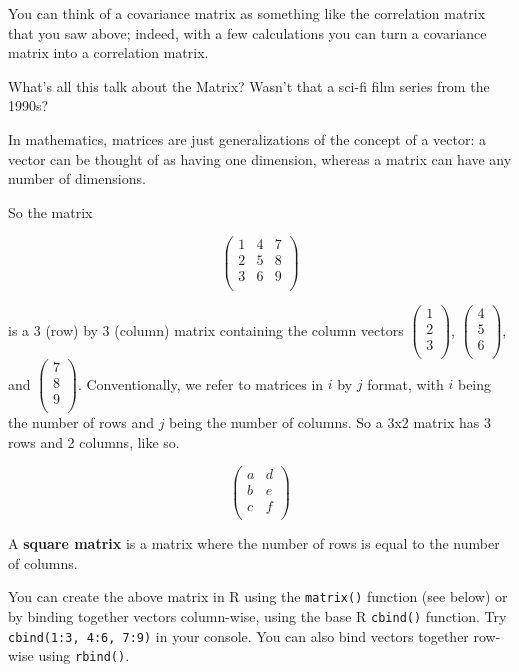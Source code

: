 \documentclass[]{book}
\begin{document}
You can think of a covariance matrix as something like the correlation matrix that you saw above; indeed, with a few calculations you can turn a covariance matrix into a correlation matrix.

\begin{info}
What's all this talk about the Matrix? Wasn't that a sci-fi film series
from the 1990s?

In mathematics, matrices are just generalizations of the concept of a
vector: a vector can be thought of as having one dimension, whereas a
matrix can have any number of dimensions.

So the matrix

\[
\begin{pmatrix}
1 & 4 & 7 \\
2 & 5 & 8 \\
3 & 6 & 9 \\
\end{pmatrix}
\]

is a 3 (row) by 3 (column) matrix containing the column vectors
\(\begin{pmatrix} 1 \\ 2 \\ 3 \\ \end{pmatrix}\),
\(\begin{pmatrix} 4 \\ 5 \\ 6 \\ \end{pmatrix}\), and
\(\begin{pmatrix} 7 \\ 8 \\ 9 \\ \end{pmatrix}\). Conventionally, we
refer to matrices in \(i\) by \(j\) format, with \(i\) being the number
of rows and \(j\) being the number of columns. So a 3x2 matrix has 3
rows and 2 columns, like so.

\[
\begin{pmatrix}
a & d \\
b & e \\
c & f \\
\end{pmatrix}
\]

A \textbf{square matrix} is a matrix where the number of rows is equal
to the number of columns.

You can create the above matrix in R using the \texttt{matrix()}
function (see below) or by binding together vectors column-wise, using
the base R \texttt{cbind()} function. Try
\texttt{cbind(1:3,\ 4:6,\ 7:9)} in your console. You can also bind
vectors together row-wise using \texttt{rbind()}.
\end{info}
\end{document}
